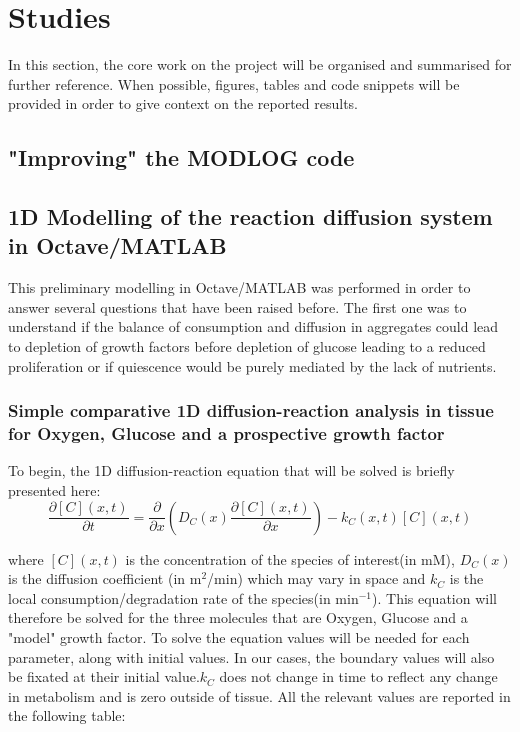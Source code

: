 \documentclass[11pt,a4paper]{article}
\begin{document}

\section{Studies}
In this section, the core work on the project will be organised and summarised for further reference. When possible, figures, tables and code snippets will be provided in order to give context on the reported results.

\subsection{"Improving" the MODLOG code}  

\subsection{1D Modelling of the reaction diffusion system in Octave/MATLAB}
This preliminary modelling in Octave/MATLAB was performed in order to answer several questions that have been raised before. The first one was to understand if the balance of consumption and diffusion in aggregates could lead to depletion of growth factors before depletion of glucose leading to a reduced proliferation or if quiescence would be purely mediated by the lack of nutrients.

\subsubsection{Simple comparative 1D diffusion-reaction analysis in tissue for Oxygen, Glucose and a prospective growth factor}
To begin, the 1D diffusion-reaction equation that will be solved is briefly presented here:
\[ \frac{\partial [C](x,t)}{\partial t} = \frac{\partial }{\partial x}(D_C(x)\frac{\partial [C](x,t)}{\partial x}) -k_C(x,t)[C](x,t) \]  

where $[C](x,t)$ is the concentration of the species of interest(in mM), $D_C(x)$ is the diffusion coefficient (in \textmu m$^2$/min) which may vary in space and $k_C$ is the local consumption/degradation rate of the species(in min$^{-1}$). This equation will therefore be solved for the three molecules that are Oxygen, Glucose and a "model" growth factor. To solve the equation values will be needed for each parameter, along with initial values. In our cases, the boundary values will also be fixated at their initial value.$k_C$ does not change in time to reflect any change in metabolism and is zero outside of tissue. All the relevant values are reported in the following table:
\end{document}
